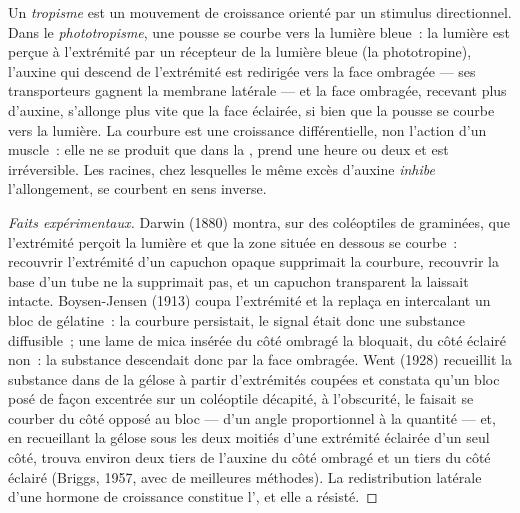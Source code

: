 \begin{proposition}[Le phototropisme]\label{prop:b2:plant-plasticity:phototropism}
Un \emph{tropisme} est un mouvement de croissance orienté par un
stimulus directionnel. Dans le \emph{phototropisme}, une pousse se
courbe vers la lumière bleue~: la lumière est perçue à l'extrémité par
un récepteur de la lumière bleue (la phototropine), l'auxine qui
descend de l'extrémité est redirigée vers la face ombragée --- ses
transporteurs gagnent la membrane latérale --- et la face ombragée,
recevant plus d'auxine, s'allonge plus vite que la face éclairée, si
bien que la pousse se courbe vers la lumière. La courbure est une
croissance différentielle, non l'action d'un muscle~: elle ne se produit
que dans la , prend une heure ou deux et est
irréversible. Les racines, chez lesquelles le même excès d'auxine
\emph{inhibe} l'allongement, se courbent en sens inverse.
\end{proposition}
\begin{proof}[Faits expérimentaux]
Darwin (1880) montra, sur des coléoptiles de graminées, que l'extrémité
perçoit la lumière et que la zone située en dessous se courbe~:
recouvrir l'extrémité d'un capuchon opaque supprimait la courbure,
recouvrir la base d'un tube ne la supprimait pas, et un capuchon
transparent la laissait intacte. Boysen-Jensen (1913) coupa l'extrémité
et la replaça en intercalant un bloc de gélatine~: la courbure
persistait, le signal était donc une substance diffusible~; une lame de
mica insérée du côté ombragé la bloquait, du côté éclairé non~: la
substance descendait donc par la face ombragée. Went (1928) recueillit
la substance dans de la gélose à partir d'extrémités coupées et
constata qu'un bloc posé de façon excentrée sur un coléoptile décapité,
à l'obscurité, le faisait se courber du côté opposé au bloc --- d'un
angle proportionnel à la quantité --- et, en recueillant la gélose sous
les deux moitiés d'une extrémité éclairée d'un seul côté, trouva
environ deux tiers de l'auxine du côté ombragé et un tiers du côté
éclairé (Briggs, 1957, avec de meilleures méthodes). La redistribution
latérale d'une hormone de croissance constitue l', et elle a résisté.
\end{proof}

